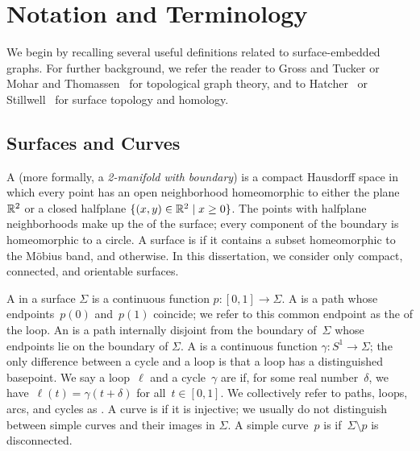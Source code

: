 \section{Notation and Terminology}
\label{sec:prelims}




We begin by recalling several useful definitions related to surface-embedded graphs.  For further background, we refer the reader to Gross and Tucker \cite{gt-tgt-01} or Mohar and Thomassen~\cite{mt-gs-01} for topological graph theory, and to Hatcher~\cite{h-at-02} or Stillwell~\cite{s-ctcgt-93} for surface topology and homology.


\subsection{Surfaces and Curves}

A  (more formally, a \emph{2-manifold with boundary}) is a compact Hausdorff space in which every point has an open neighborhood homeomorphic to either the plane $\mathbb{R}^2$ or a closed halfplane $\{ (x,y)\in \mathbb{R}^2\mid x\ge 0 \}$.  The points with halfplane neighborhoods make up the  of the surface; every component of the boundary is homeomorphic to a circle.
A surface is  if it contains a subset homeomorphic to
the M\"obius band, and  otherwise. In this dissertation, we consider only compact, connected, and orientable surfaces.

A  in a surface $\Sigma$ is a continuous function $p\colon [0,1]\to\Sigma$.
A  is a path whose endpoints~$p(0)$ and~$p(1)$ coincide;
we refer to this common endpoint as the  of the loop.
An  is a path internally disjoint from the boundary of~$\Sigma$
whose endpoints lie on the boundary of $\Sigma$.
A  is a continuous function $\gamma\colon S^1\to\Sigma$;
the only difference between a cycle and a loop is that a loop has a
distinguished basepoint.
We say a loop~$\ell$ and a cycle~$\gamma$ are  if, for some
real number~$\delta$, we have~$\ell(t) = \gamma(t + \delta)$ for
all~$t \in [0,1]$.
We collectively refer to paths, loops, arcs, and cycles as .
A curve is  if it is injective; we usually do not distinguish between simple curves and their images in $\Sigma$.
A simple curve~$p$ is  if~$\Sigma \setminus p$ is disconnected.

